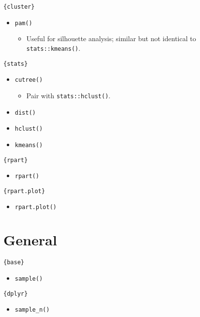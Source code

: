 \documentclass[
]{book}
\providecommand{\tightlist}{%
  \setlength{\itemsep}{0pt}\setlength{\parskip}{0pt}}
\begin{document}
\texttt{\{cluster\}}

\begin{itemize}
\tightlist
\item
  \texttt{pam()}

  \begin{itemize}
  \tightlist
  \item
    Useful for silhouette analysis; similar but not identical to \texttt{stats::kmeans()}.
  \end{itemize}
\end{itemize}

\texttt{\{stats\}}

\begin{itemize}
\tightlist
\item
  \texttt{cutree()}

  \begin{itemize}
  \tightlist
  \item
    Pair with \texttt{stats::hclust()}.
  \end{itemize}
\item
  \texttt{dist()}
\item
  \texttt{hclust()}
\item
  \texttt{kmeans()}
\end{itemize}

\texttt{\{rpart\}}

\begin{itemize}
\tightlist
\item
  \texttt{rpart()}
\end{itemize}

\texttt{\{rpart.plot\}}

\begin{itemize}
\tightlist
\item
  \texttt{rpart.plot()}
\end{itemize}

\hypertarget{general}{%
\section{General}\label{general}}

\texttt{\{base\}}

\begin{itemize}
\tightlist
\item
  \texttt{sample()}
\end{itemize}

\texttt{\{dplyr\}}

\begin{itemize}
\tightlist
\item
  \texttt{sample\_n()}
\end{itemize}
\end{document}
